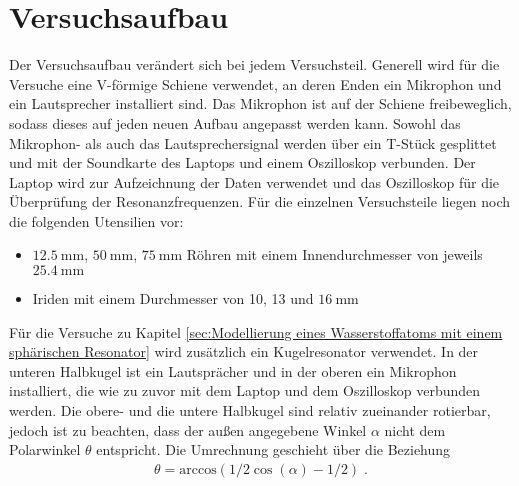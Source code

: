 \section{Versuchsaufbau}
\label{sec:Versuchaufbau}

Der Versuchsaufbau verändert sich bei jedem Versuchsteil. Generell wird für die Versuche eine V-förmige Schiene verwendet, an deren Enden ein Mikrophon und ein Lautsprecher installiert sind. Das Mikrophon ist auf der Schiene freibeweglich, sodass  dieses auf jeden neuen Aufbau angepasst werden kann. Sowohl das Mikrophon- als auch das Lautsprechersignal werden über ein T-Stück gesplittet und mit der Soundkarte des Laptops und einem Oszilloskop verbunden.
Der Laptop wird zur Aufzeichnung der Daten verwendet und das Oszilloskop für die Überprüfung der Resonanzfrequenzen. Für die einzelnen Versuchsteile liegen noch die folgenden Utensilien vor:

\begin{itemize}
\item $\SI{12.5}{\milli\meter}$, $\SI{50}{\milli\meter}$, $\SI{75}{\milli\meter}$ Röhren mit einem Innendurchmesser von jeweils $\SI{25.4}{\milli\meter}$
\item Iriden mit einem Durchmesser von 10, 13 und $\SI{16}{\milli\meter}$
\end{itemize}

Für die Versuche zu Kapitel \ref{sec:Modellierung eines Wasserstoffatoms mit einem sphärischen Resonator} wird zusätzlich ein Kugelresonator verwendet. In der unteren Halbkugel ist ein Lautsprächer und in der oberen ein Mikrophon installiert, die wie zu zuvor mit dem Laptop und dem Oszilloskop verbunden werden. Die obere- und die untere Halbkugel sind relativ zueinander rotierbar, jedoch ist zu beachten, dass der außen angegebene Winkel $\alpha$ nicht dem Polarwinkel $\theta$ entspricht. Die Umrechnung geschieht über die Beziehung
\begin{align}
  	\theta = \text{arccos}(1/2\cos{(\alpha)}-1/2)\;.
    \label{eq:ThetaVonAlpha}
\end{align}
